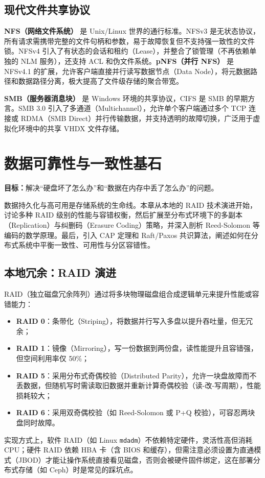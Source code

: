 \documentclass[12pt,UTF8]{ctexbook}
\begin{document}
	\section{现代文件共享协议}
	
	\textbf{NFS（网络文件系统）} 是 Unix/Linux 世界的通行标准。NFSv3 是无状态协议，所有请求需携带完整的文件句柄和参数，易于故障恢复但不支持强一致性的文件锁。NFSv4 引入了有状态的会话和租约（Lease），并整合了锁管理（不再依赖单独的 NLM 服务），还支持 ACL 和伪文件系统。\textbf{pNFS（并行 NFS）} 是 NFSv4.1 的扩展，允许客户端直接并行读写数据节点（Data Node），将元数据路径和数据路径分离，极大提高了文件级存储的聚合带宽。
	
	\textbf{SMB（服务器消息块）} 是 Windows 环境的共享协议，CIFS 是 SMB 的早期方言。SMB 3.0 引入了多通道（Multichannel），允许单个客户端通过多个 TCP 连接或 RDMA（SMB Direct）并行传输数据，并支持透明的故障切换，广泛用于虚拟化环境中的共享 VHDX 文件存储。
	
	\chapter{数据可靠性与一致性基石}
	\textbf{目标：}解决“硬盘坏了怎么办”和“数据在内存中丢了怎么办”的问题。
	
	数据持久化与高可用是存储系统的生命线。本章从本地的 RAID 技术演进开始，讨论多种 RAID 级别的性能与容错权衡，然后扩展至分布式环境下的多副本（Replication）与纠删码（Erasure Coding）策略，并深入剖析 Reed-Solomon 等编码的数学原理。最后，引入 CAP 定理和 Raft/Paxos 共识算法，阐述如何在分布式系统中平衡一致性、可用性与分区容错性。
	
	\section{本地冗余：RAID 演进}
	
	RAID（独立磁盘冗余阵列）通过将多块物理磁盘组合成逻辑单元来提升性能或容错能力：
	\begin{itemize}
		\item \textbf{RAID 0}：条带化（Striping），将数据并行写入多盘以提升吞吐量，但无冗余；
		\item \textbf{RAID 1}：镜像（Mirroring），写一份数据到两份盘，读性能提升且容错强，但空间利用率仅 50\%；
		\item \textbf{RAID 5}：采用分布式奇偶校验（Distributed Parity），允许一块盘故障而不丢数据，但随机写时需读取旧数据并重新计算奇偶校验（读-改-写周期），性能损耗较大；
		\item \textbf{RAID 6}：采用双奇偶校验（如 Reed-Solomon 或 P+Q 校验），可容忍两块盘同时故障。
	\end{itemize}
	实现方式上，软件 RAID（如 Linux \texttt{mdadm}）不依赖特定硬件，灵活性高但消耗 CPU；硬件 RAID 依赖 HBA 卡（含 BIOS 和缓存），但需注意必须设置为直通模式（JBOD）才能让操作系统直接看见磁盘，否则会被硬件固件绑定，这在部署分布式存储（如 Ceph）时是常见的踩坑点。
	
\end{document}
